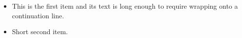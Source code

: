 \begin{itemize}
  \item This is the first item and its text is long enough to require wrapping onto a continuation line.
  \item Short second item.
\end{itemize}
